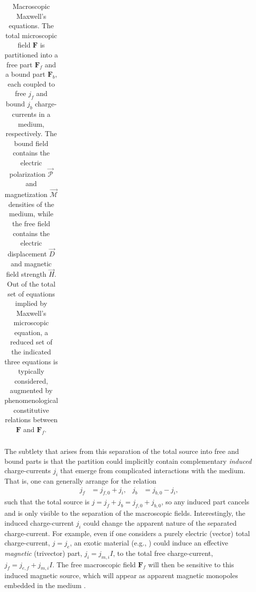 \documentclass[1p,sort&compress]{elsarticle}
\numberwithin{equation}{section}
\newcommand{\rv}[1]{\vec{#1}}
\newcommand{\bv}[1]{\mathbf{#1}}
\begin{document}
\begin{table}
\begin{tabular}{l l}
    \hline 
 \end{tabular}
 \caption[Maxwell's macroscopic equations]{Macroscopic Maxwell's equations. The total microscopic field $\bv{F}$ is partitioned into a free part $\bv{F}_f$ and a bound part $\bv{F}_b$, each coupled to free $j_f$ and bound $j_b$ charge-currents in a medium, respectively.  The bound field contains the electric polarization $\rv{\mathcal{P}}$ and magnetization $\rv{\mathcal{M}}$ densities of the medium, while the free field contains the electric displacement $\rv{D}$ and magnetic field strength $\rv{H}$.  Out of the total set of equations implied by Maxwell's microscopic equation, a reduced set of the indicated three equations is typically considered, augmented by phenomenological constitutive relations between $\bv{F}$ and $\bv{F}_f$. }
 \label{tab:macroscopicmaxwell}
\end{table}

The subtlety that arises from this separation of the total source into free and bound parts is that the partition could implicitly contain complementary \emph{induced} charge-currents $j_i$ that emerge from complicated interactions with the medium.  That is, one can generally arrange for the relation
\begin{align}\label{eq:inducedchargecurrent}
  j_f &= j_{f,0} + j_i, & 
  j_b &= j_{b,0} - j_i,
\end{align}
such that the total source is $j = j_f + j_b = j_{f,0} + j_{b,0}$, so any induced part cancels and is only visible to the separation of the macroscopic fields.  Interestingly, the induced charge-current $j_i$ could change the apparent nature of the separated charge-current.  For example, even if one considers a purely electric (vector) total charge-current, $j = j_e$, an exotic material (e.g., \cite{Castelnovo2008,Giblin2011,Braun2014,Paulsen2014,Ray2014}) could induce an effective \emph{magnetic} (trivector) part, $j_i = j_{m,i}I$, to the total free charge-current, $j_f = j_{e,f} + j_{m,i}I$.  The free macroscopic field $\bv{F}_f$ will then be sensitive to this induced magnetic source, which will appear as apparent magnetic monopoles embedded in the medium \cite{Shnir2005}. 
\end{document}
